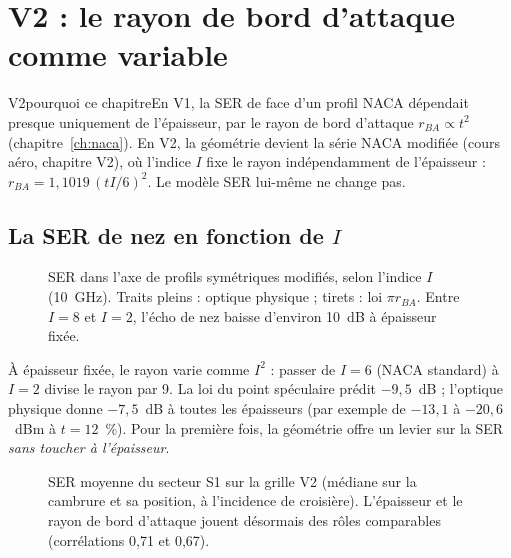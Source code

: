 \chapter{V2 : le rayon de bord d'attaque comme variable}\label{ch:v2}

\begin{evolution}{V2}{pourquoi ce chapitre}En V1, la SER de face d'un profil NACA dépendait presque uniquement de l'épaisseur, par le rayon de bord d'attaque $r_{BA}\propto t^2$ (chapitre~\ref{ch:naca}). En V2, la géométrie devient la série NACA modifiée (cours aéro, chapitre V2), où l'indice $I$ fixe le rayon indépendamment de l'épaisseur : $r_{BA}=1{,}1019\,(tI/6)^2$. Le modèle SER lui-même ne change pas.\end{evolution}

\section{La SER de nez en fonction de $I$}
\begin{figure}[htbp]
\centering

\caption{SER dans l'axe de profils symétriques modifiés, selon l'indice $I$ (10~GHz). Traits pleins : optique physique ; tirets : loi $\pi r_{BA}$. Entre $I=8$ et $I=2$, l'écho de nez baisse d'environ 10~dB à épaisseur fixée.}\label{fig:v2-nez}
\end{figure}

À épaisseur fixée, le rayon varie comme $I^2$ : passer de $I=6$ (NACA standard) à $I=2$ divise le rayon par 9. La loi du point spéculaire prédit $-9{,}5$~dB ; l'optique physique donne $-7{,}5$~dB à toutes les épaisseurs (par exemple de $-13{,}1$ à $-20{,}6$~dBm à $t=12$~\%). Pour la première fois, la géométrie offre un levier sur la SER \emph{sans toucher à l'épaisseur}.

\begin{figure}[htbp]
\centering

\caption{SER moyenne du secteur S1 sur la grille V2 (médiane sur la cambrure et sa position, à l'incidence de croisière). L'épaisseur et le rayon de bord d'attaque jouent désormais des rôles comparables (corrélations 0,71 et 0,67).}\label{fig:v2-carte}
\end{figure}

